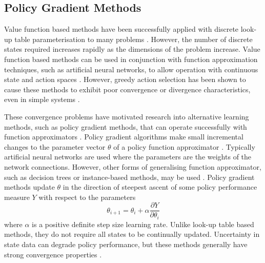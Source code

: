 \subsection{Policy Gradient Methods}
\label{sec:policygradient}
Value function based methods have been successfully applied with discrete
look-up table parameterisation to many problems \cite{kaelbling:1996}.  However,
the number of discrete states required increases rapidly as the dimensions of
the problem increase.
Value function based methods can be used in conjunction with function
approximation techniques, such as artificial neural networks, to allow operation
with continuous state and action spaces \cite{sutton:1996}.  However, greedy
action selection has been shown to cause these methods to exhibit poor
convergence or divergence characteristics, even in simple systems
\cite{tsitsiklis:94,peters:enac,gordon:95,baird:95}.

These convergence problems have motivated research into alternative learning
methods, such as policy gradient methods, that can operate successfully with
function approximators \cite{peters:enac}. Policy gradient algorithms make small
incremental changes to the parameter vector $\theta$ of a policy function
approximator \cite{sutton:2000}. Typically artificial neural networks are used
where the parameters are the weights of the network connections. However,
other forms of generalising function approximator, such as decision trees or
instance-based methods, may be used \cite{barto:policy}.  Policy
gradient methods update $\theta$ in the direction of steepest ascent of some
policy performance measure $Y$ with respect to the parameters
\begin{equation}
\theta_{i+1} = \theta_i + \alpha \frac{\partial Y}{\partial \theta_i}
\end{equation}
where $\alpha$ is a positive definite step size learning rate.  Unlike look-up
table based methods, they do not require all states to be continually updated.
Uncertainty in state data can degrade policy performance, but these methods
generally have strong convergence properties \cite{sutton:2000}.

